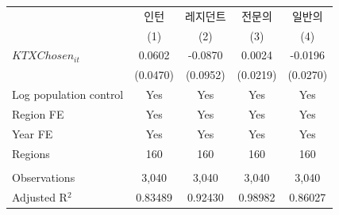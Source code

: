 \begingroup
\centering
\begin{tabular}{lcccc}
   \toprule
                          & 인턴     & 레지던트 & 전문의   & 일반의 \\   
                          & (1)      & (2)      & (3)      & (4)\\  
   \midrule 
   $KTXChosen_{it}$       & 0.0602   & -0.0870  & 0.0024   & -0.0196\\   
                          & (0.0470) & (0.0952) & (0.0219) & (0.0270)\\   
   Log population control & Yes      & Yes      & Yes      & Yes\\  
   Region FE              & Yes      & Yes      & Yes      & Yes\\  
   Year FE                & Yes      & Yes      & Yes      & Yes\\  
   Regions                & 160      & 160      & 160      & 160\\  
    \\
   Observations           & 3,040    & 3,040    & 3,040    & 3,040\\  
   Adjusted R$^2$         & 0.83489  & 0.92430  & 0.98982  & 0.86027\\  
   \bottomrule
\end{tabular}
\par\endgroup
